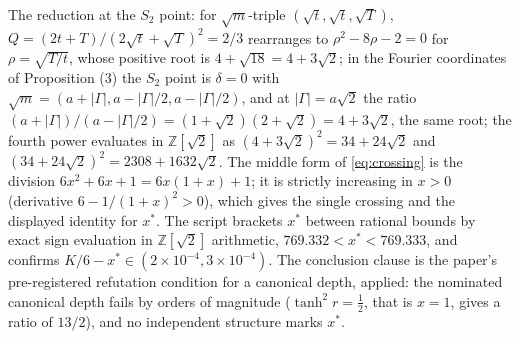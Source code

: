 The reduction at the $S_{2}$ point: for $\sqrt{m}$-triple $(\sqrt{t}, \sqrt{t}, \sqrt{T})$, $Q = (2t + T)/(2\sqrt{t} + \sqrt{T})^{2} = 2/3$ rearranges to $\rho^{2} - 8\rho - 2 = 0$ for $\rho = \sqrt{T/t}$, whose positive root is $4 + \sqrt{18} = 4 + 3\sqrt{2}$; in the Fourier coordinates of Proposition (3) the $S_{2}$ point is $\delta = 0$ with $\sqrt{m} = (a + |\Gamma|, a - |\Gamma|/2, a - |\Gamma|/2)$, and at $|\Gamma| = a\sqrt{2}$ the ratio $(a + |\Gamma|)/(a - |\Gamma|/2) = (1 + \sqrt{2})(2 + \sqrt{2}) = 4 + 3\sqrt{2}$, the same root; the fourth power evaluates in $\mathbb{Z}[\sqrt{2}]$ as $(4+3\sqrt{2})^{2} = 34 + 24\sqrt{2}$ and $(34+24\sqrt{2})^{2} = 2308 + 1632\sqrt{2}$. The middle form of \eqref{eq:crossing} is the division $6x^{2} + 6x + 1 = 6x(1+x) + 1$; it is strictly increasing in $x > 0$ (derivative $6 - 1/(1+x)^{2} > 0$), which gives the single crossing and the displayed identity for $x^{*}$. The script brackets $x^{*}$ between rational bounds by exact sign evaluation in $\mathbb{Z}[\sqrt{2}]$ arithmetic, $769.332 < x^{*} < 769.333$, and confirms $K/6 - x^{*} \in (2 \times 10^{-4}, 3 \times 10^{-4})$. The conclusion clause is the paper's pre-registered refutation condition for a canonical depth, applied: the nominated canonical depth fails by orders of magnitude ($\tanh^{2}r = \tfrac12$, that is $x = 1$, gives a ratio of $13/2$), and no independent structure marks $x^{*}$.
